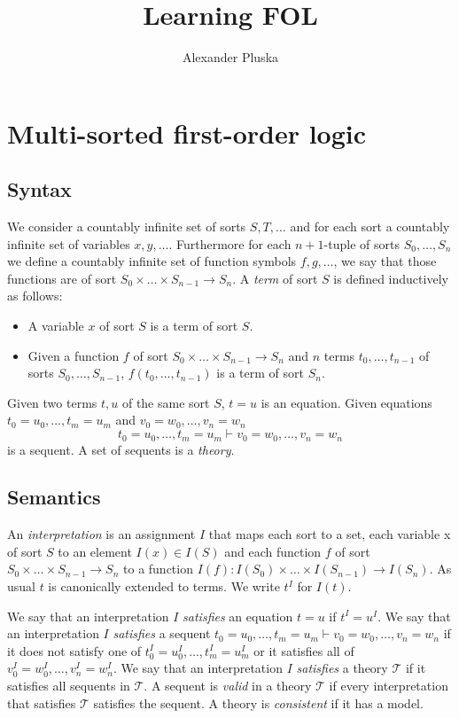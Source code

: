 \documentclass[11pt]{article}
\title{Learning FOL}
\author{Alexander Pluska}
\begin{document}
    \maketitle

    \section{Multi-sorted first-order logic}
    \subsection{Syntax}

    We consider a countably infinite set of sorts $S, T,\dots$ and for each sort a countably infinite set of variables $x, y,\dots$. Furthermore for each $n+1$-tuple of sorts $S_0,\dots, S_n$ we define a countably infinite set of function symbols $f, g,\dots$, we say that those functions are of sort $S_0\times\dots\times S_{n-1}\to S_n$. A \emph{term} of sort $S$ is defined inductively as follows:
    \begin{itemize}
        \item A variable $x$ of sort $S$ is a term of sort $S$.
        \item Given a function $f$ of sort $S_0\times\dots\times S_{n-1}\to S_n$ and $n$ terms $t_0,\dots, t_{n-1}$ of sorts $S_0,\dots, S_{n-1}$,  $f(t_0,\dots, t_{n-1})$ is a term of sort $S_n$.
    \end{itemize}
    Given two terms $t, u$ of the same sort $S$, $t=u$ is an equation. Given equations $t_0=u_0,\dots, t_m=u_m$ and $v_0=w_0,\dots,v_n=w_n$
    $$t_0=u_0,\dots, t_m=u_m\vdash v_0=w_0,\dots,v_n=w_n$$
    is a sequent. A set of sequents is a \emph{theory}.

    \subsection{Semantics}
    An \emph{interpretation} is an assignment $I$ that maps each sort to a set, each variable x of sort $S$ to an element $I(x)\in I(S)$ and each function $f$ of sort $S_0\times\dots\times S_{n-1}\to S_n$ to a function $I(f):I(S_0)\times\dots\times I(S_{n-1})\to I(S_n)$. As usual $t$ is canonically extended to terms. We write $t^I$ for $I(t)$.
    
    We say that an interpretation $I$ \emph{satisfies} an equation $t=u$ if $t^I=u^I$. We say that an interpretation $I$ \emph{satisfies} a sequent $t_0=u_0,\dots, t_m=u_m\vdash v_0=w_0,\dots,v_n=w_n$ if it does not satisfy one of $t_0^I=u_0^I,\dots, t_m^I=u_m^I$ or it satisfies all of $v_0^I=w_0^I,\dots,v_n^I=w_n^I$. We say that an interpretation $I$ \emph{satisfies} a theory $\mathcal{T}$ if it satisfies all sequents in $\mathcal{T}$. A sequent is \emph{valid} in a theory $\mathcal{T}$ if every interpretation that satisfies $\mathcal{T}$ satisfies the sequent. A theory is \emph{consistent} if it has a model.
\end{document}
